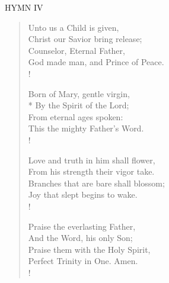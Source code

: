 \small{\uppercase{Hymn IV}}\normalsize
\begin{verse}
Unto us a Child is given,\\
Christ our Savior bring release;\\
Counselor, Eternal Father,\\
God made man, and Prince of Peace.\\!

Born of Mary, gentle virgin,\\*
By the Spirit of the Lord;\\
From eternal ages spoken:\\
This the mighty Father's Word.\\!

Love and truth in him shall flower,\\
From his strength their vigor take.\\
Branches that are bare shall blossom;\\
Joy that slept begins to wake.\\!

Praise the everlasting Father,\\
And the Word, his only Son;\\
Praise them with the Holy Spirit,\\
Perfect Trinity in One. Amen.\\!
\end{verse}
\label{christmas:lastHymn}